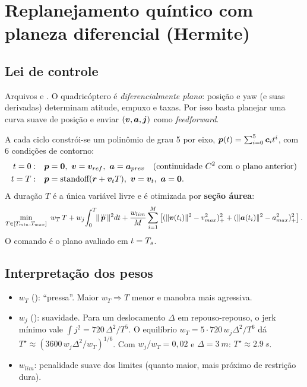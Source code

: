 \chapter{Replanejamento quíntico com planeza diferencial (Hermite)}
\label{cap:hermite}

\section{Lei de controle}
Arquivos  e .
O quadricóptero é \emph{diferencialmente plano}: posição e yaw (e suas derivadas)
determinam atitude, empuxo e taxas. Por isso basta planejar uma curva suave de
posição e enviar $(\bm{v},\bm{a},\bm{j})$ como \emph{feedforward}.

A cada ciclo constrói-se um polinômio de grau 5 por eixo, $\bm{p}(t)=\sum_{i=0}^5
\bm{c}_i t^i$, com 6 condições de contorno:
\begin{align}
  t=0:&\quad \bm{p}=\bm{0},\ \bm{v}=\bm{v}_{ref},\ \bm{a}=\bm{a}_{prev}
       \quad\text{(continuidade $C^2$ com o plano anterior)}\\
  t=T:&\quad \bm{p}=\text{standoff}(\bm{r}+\bm{v}_tT),\ \bm{v}=\bm{v}_t,\ \bm{a}=\bm{0} .
\end{align}
A duração $T$ é a única variável livre e é otimizada por \textbf{seção áurea}:
\begin{equation}
  \min_{T\in[T_{min},T_{max}]}\ w_T\,T + w_j\!\int_0^T\!\lVert\dddot{\bm{p}}\rVert^2dt
  + \frac{w_{lim}}{M}\sum_{i=1}^{M}\left[(\lVert\bm{v}(t_i)\rVert^2-v_{max}^2)_+^2
  + (\lVert\bm{a}(t_i)\rVert^2-a_{max}^2)_+^2\right].
\end{equation}
O comando é o plano avaliado em $t=T_s$.

\section{Interpretação dos pesos}
\begin{itemize}
  \item $w_T$ (): ``pressa''. Maior $w_T\Rightarrow T$ menor e manobra
        mais agressiva.
  \item $w_j$ (): suavidade. Para um deslocamento $\Delta$ em
        repouso-repouso, o jerk mínimo vale $\int j^2 = 720\,\Delta^2/T^5$. O equilíbrio
        $w_T = 5\cdot720\,w_j\Delta^2/T^6$ dá
        $T^\star\approx(3600\,w_j\Delta^2/w_T)^{1/6}$. Com $w_j/w_T=0{,}02$ e
        $\Delta=\SI{3}{m}$: $T^\star\approx\SI{2,9}{s}$.
  \item $w_{lim}$: penalidade suave dos limites (quanto maior, mais próximo de restrição
        dura).
\end{itemize}


